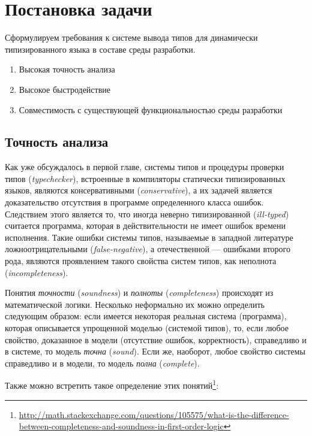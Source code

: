 \chapter{Постановка задачи}

Сформулируем требования к системе вывода типов для динамически
типизированного языка в составе среды разработки.

\begin{enumerate}
    \item{Высокая точность анализа}
    \item{Высокое быстродействие}
    \item{Совместимость с существующей функциональностью среды разработки}
\end{enumerate}

\section{Точность анализа}
\label{sec:precision-requirement}

Как уже обсуждалось в первой главе, системы типов и процедуры проверки типов
(\emph{typechecker}), встроенные в компиляторы статически типизированных
языков, являются консервативными (\emph{conservative}), а их задачей является
доказательство отсутствия в программе определенного класса ошибок. Следствием
этого является то, что иногда неверно типизированной (\emph{ill-typed})
считается программа, которая в действительности не имеет ошибок времени
исполнения. Такие ошибки системы типов, называемые в западной литературе
ложноотрицательными (\emph{false-negative}), а отечественной --- ошибками второго
рода, являются проявлением такого свойства систем типов, как неполнота
(\emph{incompleteness}). 

Понятия \emph{точности} (\emph{soundness}) и \emph{полноты}
(\emph{completeness}) происходят из математической логики. Несколько неформально
их можно определить следующим образом: если имеется некоторая реальная система
(программа), которая описывается упрощенной моделью (системой типов), то, если
любое свойство, доказанное в модели (отсутствие ошибок, корректность),
справедливо и в системе, то модель \emph{точна} (\emph{sound}).  Если же,
наоборот, любое свойство системы справедливо и в модели, то модель \emph{полна}
(\emph{complete}).

Также можно встретить такое определение этих
понятий\footnote{\url{http://math.stackexchange.com/questions/105575/what-is-the-difference-between-completeness-and-soundness-in-first-order-logic}}:

